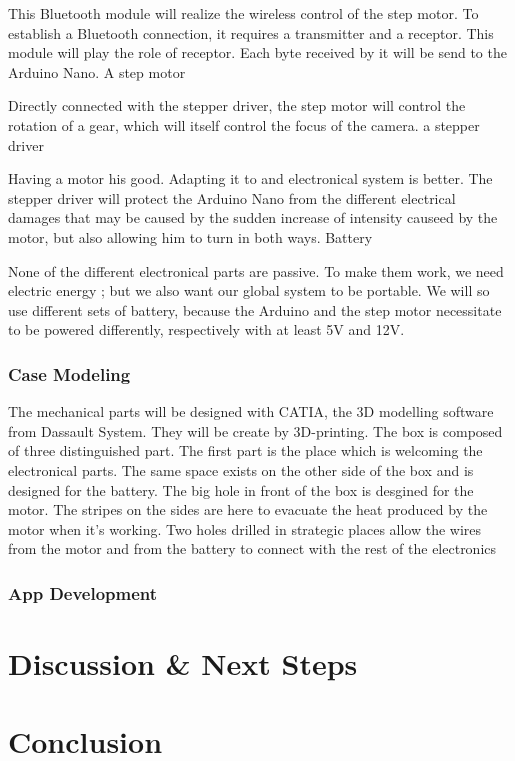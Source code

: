 \documentclass{sigchi}
\begin{document}
This Bluetooth module will realize the wireless control of the step motor. To establish a Bluetooth connection, it requires a transmitter and a receptor. This module will play the role of receptor. Each byte received by it will be send to the Arduino Nano.
A step motor
 
Directly connected with the stepper driver, the step motor will control the rotation of a gear, which will itself control the focus of the camera. 
a stepper driver
 
Having a motor his good. Adapting it to and electronical system is better. The stepper driver will protect the Arduino Nano from the different electrical damages that may be caused by the sudden increase of intensity causeed by the motor, but also allowing him to turn in both ways.
Battery
 
None of the different electronical parts are passive. To make them work, we need electric energy ; but we also want our global system  to be portable. We will so use different sets of battery, because the Arduino and the step motor necessitate to be powered differently, respectively with at least 5V and 12V.


\subsubsection{Case Modeling}

The mechanical parts will be designed with CATIA, the 3D modelling software from Dassault System. They will be create by 3D-printing.
The box is composed of three distinguished part. The first part is the place which is welcoming the electronical parts.
The same space exists on the other side of the box and is designed for the battery.
The big hole in front of the box is desgined for the motor. The stripes on the sides are here to evacuate the heat produced by the motor when it’s working.
Two holes drilled in strategic places allow the wires from the motor and from the battery to connect with the rest of the electronics


\subsubsection{App Development}

\section{Discussion & Next Steps}

\section{Conclusion}



\end{document}
